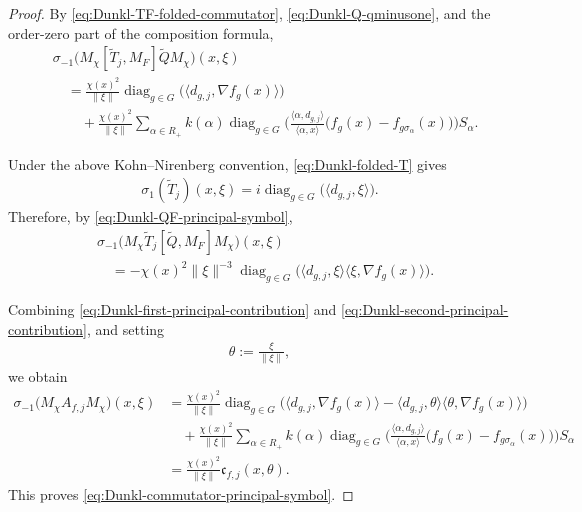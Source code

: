 \documentclass{amsart}
\begin{document}
\begin{proof}
By \eqref{eq:Dunkl-TF-folded-commutator},
\eqref{eq:Dunkl-Q-qminusone}, and the order-zero part of the
composition formula,
\begin{align}
&
\sigma_{-1}
\big(
M_\chi[\widetilde T_j,M_F]
\widetilde Q M_\chi
\big)(x,\xi)
\nonumber\\
&\quad=
\frac{\chi(x)^2}{\|\xi\|}
\operatorname{diag}_{g\in G}
\big(
\langle d_{g,j},\nabla f_g(x)\rangle
\big)
\nonumber\\
&\qquad+
\frac{\chi(x)^2}{\|\xi\|}
\sum_{\alpha\in R_+}
k(\alpha)
\operatorname{diag}_{g\in G}
\bigg(
\frac{\langle\alpha,d_{g,j}\rangle}
{\langle\alpha,x\rangle}
\big(
f_g(x)-f_{g\sigma_\alpha}(x)
\big)
\bigg)S_\alpha.
\label{eq:Dunkl-first-principal-contribution}
\end{align}

Under the above Kohn--Nirenberg convention,
\eqref{eq:Dunkl-folded-T} gives
\begin{align*}
\sigma_1(\widetilde T_j)(x,\xi)
=
i\operatorname{diag}_{g\in G}
\big(
\langle d_{g,j},\xi\rangle
\big).
\end{align*}
Therefore, by \eqref{eq:Dunkl-QF-principal-symbol},
\begin{align}
&
\sigma_{-1}
\big(
M_\chi\widetilde T_j
[\widetilde Q,M_F]M_\chi
\big)(x,\xi)
\nonumber\\
&\quad=
-\chi(x)^2\|\xi\|^{-3}
\operatorname{diag}_{g\in G}
\big(
\langle d_{g,j},\xi\rangle
\langle\xi,\nabla f_g(x)\rangle
\big).
\label{eq:Dunkl-second-principal-contribution}
\end{align}

Combining
\eqref{eq:Dunkl-first-principal-contribution} and
\eqref{eq:Dunkl-second-principal-contribution}, and setting
\begin{align*}
\theta:=\frac{\xi}{\|\xi\|},
\end{align*}
we obtain
\begin{align*}
\sigma_{-1}
\big(
M_\chi A_{f,j}M_\chi
\big)(x,\xi)
&=
\frac{\chi(x)^2}{\|\xi\|}
\operatorname{diag}_{g\in G}
\bigg(
\langle d_{g,j},\nabla f_g(x)\rangle
-
\langle d_{g,j},\theta\rangle
\langle\theta,\nabla f_g(x)\rangle
\bigg)
\\
&\quad+
\frac{\chi(x)^2}{\|\xi\|}
\sum_{\alpha\in R_+}
k(\alpha)
\operatorname{diag}_{g\in G}
\bigg(
\frac{\langle\alpha,d_{g,j}\rangle}
{\langle\alpha,x\rangle}
\big(
f_g(x)-f_{g\sigma_\alpha}(x)
\big)
\bigg)S_\alpha
\\
&=
\frac{\chi(x)^2}{\|\xi\|}
\mathfrak c_{f,j}(x,\theta).
\end{align*}
This proves \eqref{eq:Dunkl-commutator-principal-symbol}.
\end{proof}
\end{document}
